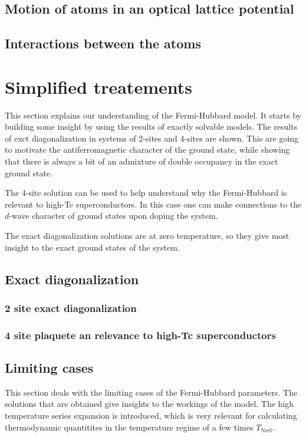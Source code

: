 \documentclass[oneside,11pt]{memoir}
\begin{document}
\subsection{ Motion of atoms in an optical lattice potential }
\subsection{ Interactions between the atoms }  

\section{Simplified treatements}

This section explains our understanding of the Fermi-Hubbard model.  It starts
by building some insight by using the results of exactly solvable models.   The
results of exct diagonalization in systems of 2-sites and 4-sites are shown.
This are going to motivate the antiferromagnetic character of the ground state,
while showing that there is always a bit of an admixture of double occupancy in
the exact ground state.  

The 4-site solution can be used to help understand why the Fermi-Hubbard is relevant to high-Tc superconductors.   In this case one can make connections to the $d$-wave character of ground states upon doping the system.   

The exact diagonalization solutions are at zero temperature, so they give most
insight to the exact ground states of the system. 

\subsection{ Exact diagonalization } 
\subsubsection { 2 site exact diagonalization } 
\subsubsection { 4 site plaquete an relevance to high-Tc superconductors}

\subsection{ Limiting cases} 

This section deals with the limiting cases of the Fermi-Hubbard parameters.
The solutions that are obtained give insights to the workings of the model.
The high temperature series expansion is introduced, which is very relevant for
calculating thermodynamic quantitites in the temperature regime of a few times
$T_{\mathrm{Neel}}$.  
\end{document}
